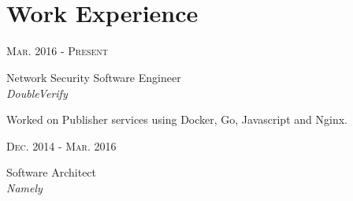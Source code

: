 \documentclass[10pt]{article} %
\begin{document}
\color{text1} %


\par{\\ %
\par{}\\
	

\begin{minipage}[t]{0.5\textwidth} %
\vspace{0pt} %
	

\section{Work Experience} 


{\raggedleft\textsc{Mar. 2016 - Present}\par}

{\raggedright\large Network Security Software Engineer\\
\textit{DoubleVerify}\\[5pt]}

\small{Worked on Publisher services using Docker, Go, Javascript and Nginx.}\\


{\raggedleft\textsc{Dec. 2014 - Mar. 2016}\par}

{\raggedright\large Software Architect\\
\textit{Namely}\\[5pt]}


\end{minipage}}
\end{document}
